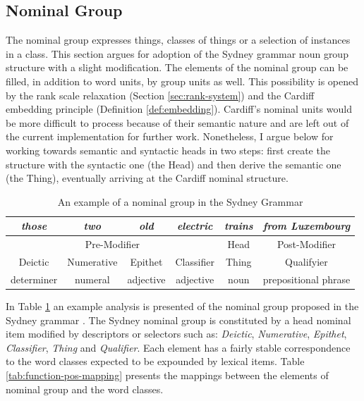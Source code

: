 


\subsection{Nominal Group}
\label{sec:nominal-group}

The nominal group expresses things, classes of things or a selection of instances in a class. This section argues for adoption of the Sydney grammar noun group structure with a slight modification. The elements of the nominal group can be filled, in addition to word units, by group units as well. This possibility is opened by the rank scale relaxation (Section \ref{sec:rank-system}) and the Cardiff embedding principle (Definition \ref{def:embedding}). Cardiff's nominal units would be more difficult to process because of their semantic nature and are left out of the current implementation for further work. Nonetheless, I argue below for working towards semantic and syntactic heads in two steps: first create the structure with the syntactic one (the Head) and then derive the semantic one (the Thing), eventually arriving at the Cardiff nominal structure.

\begin{table}[!ht]
    \centering
	\begin{tabular}{|c|c|c|c|c|c|}
		\hline
		\textit{those} & \textit{two} & \textit{old} & \textit{electric} & \textit{trains} & \textit{from Luxembourg} \\ \hline
		\multicolumn{4}{|c|}{Pre-Modifier}                               & Head            & Post-Modifier            \\ \hline
		Deictic        & Numerative   & Epithet      & Classifier        & Thing           & Qualifyier               \\ \hline
		determiner     & numeral      & adjective    & adjective         & noun            & prepositional phrase     \\ \hline
	\end{tabular}
	\caption{An example of a nominal group in the Sydney Grammar \citep[264]{Halliday2013}}
	\label{tab:example-ng}
\end{table}

In  Table \ref{tab:example-ng} an example analysis is presented of the nominal group proposed in the Sydney grammar \citep[364--369]{Halliday2013}. The Sydney nominal group is constituted by a head nominal item modified by descriptors or selectors such as: \textit{Deictic}, \textit{Numerative}, \textit{Epithet}, \textit{Classifier}, \textit{Thing} and \textit{Qualifier}. Each element has a fairly stable correspondence to the word classes expected to be expounded by lexical items. Table \ref{tab:function-pos-mapping} presents the mappings between the elements of nominal group and the word classes. 

